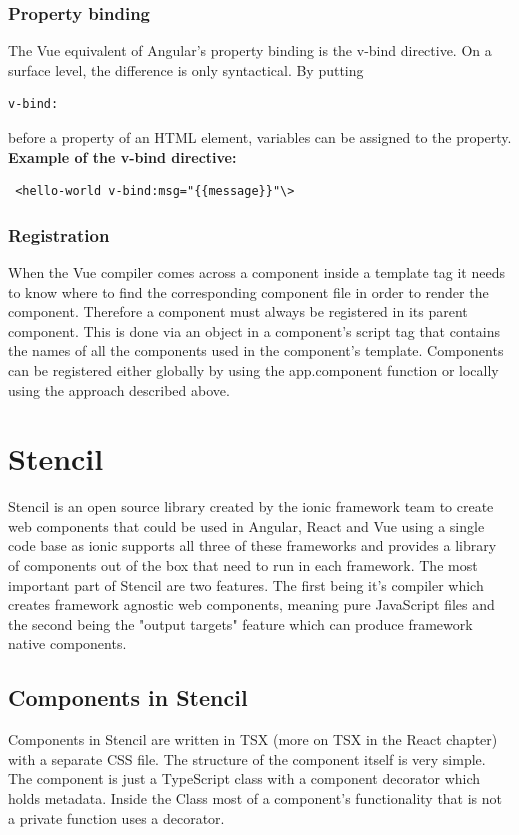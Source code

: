 \subsubsection{Property binding}
The Vue equivalent of Angular's property binding is the v-bind directive. On a surface level, the difference is only syntactical. By putting \begin{verbatim}
v-bind: 
\end{verbatim}
before a property of an HTML element, variables can be assigned to the property.
\textbf{Example of the v-bind directive:}
\begin{Verbatim}
 <hello-world v-bind:msg="{{message}}"\>
\end{Verbatim}
\subsubsection{Registration}
When the Vue compiler comes across a component inside a template tag it needs to know where to find the corresponding component file in order to render the component. Therefore a component must always be registered in its parent component. This is done via an object in a component's script tag that contains the names of all the components used in the component's template.
Components can be registered either globally by using the app.component function or locally using the approach described above.

\section{Stencil}
Stencil is an open source library created by the ionic framework team to create web components that could be used in Angular, React and Vue using a single code base as ionic supports all three of these frameworks and provides a library of components out of the box that need to run in each framework. The most important part of Stencil are two features. The first being it's compiler which creates framework agnostic web  components, meaning pure JavaScript files and the second being the "output targets" feature which can produce framework native components.

\subsection{Components in Stencil}
Components in Stencil are written in TSX (more on TSX in the React chapter) with a separate CSS file. The structure of the component itself is very simple. The component is just a TypeScript class with a component decorator which holds metadata. Inside the Class most of a component's functionality that is not a private function uses a decorator.

